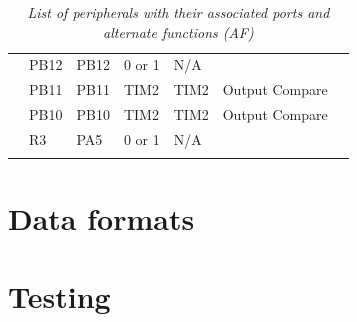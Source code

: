 \documentclass[11pt,a4paper]{report}
\begin{document}
\begin{table}[!h]
{\begin{tabular}{cllllll}
\multicolumn{1}{|c|}{} & \multicolumn{1}{l|}{PB12} & \multicolumn{1}{l|}{PB12} & \multicolumn{1}{l|}{0 or 1} & \multicolumn{1}{l|}{N/A} & \multicolumn{1}{l|}{} & \multicolumn{1}{l|}{} \\ \cline{2-7} 
\multicolumn{1}{|c|}{} & \multicolumn{1}{l|}{PB11} & \multicolumn{1}{l|}{PB11} & \multicolumn{1}{l|}{TIM2} & \multicolumn{1}{l|}{TIM2} & \multicolumn{1}{l|}{Output Compare} & \multicolumn{1}{l|}{} \\ \cline{2-7} 
\multicolumn{1}{|c|}{} & \multicolumn{1}{l|}{PB10} & \multicolumn{1}{l|}{PB10} & \multicolumn{1}{l|}{TIM2} & \multicolumn{1}{l|}{TIM2} & \multicolumn{1}{l|}{Output Compare} & \multicolumn{1}{l|}{} \\ \cline{2-7} 
\multicolumn{1}{|c|}{} & \multicolumn{1}{l|}{R3} & \multicolumn{1}{l|}{PA5} & \multicolumn{1}{l|}{0 or 1} & \multicolumn{1}{l|}{N/A} & \multicolumn{1}{l|}{} & \multicolumn{1}{l|}{} \\ \hline
\multicolumn{1}{l}{} &  &  &  &  &  & 
\end{tabular}
}
\caption{\textit{List of peripherals with their associated ports and alternate functions (AF)}}
\label{port_list} 
\end{table}

\chapter{Data formats}\thispagestyle{fancy}

\chapter{Testing}\thispagestyle{fancy} 
\end{document}
